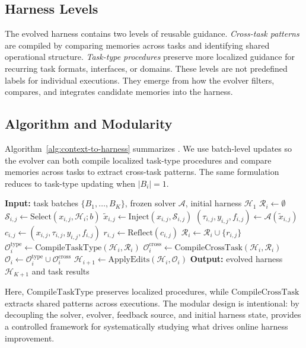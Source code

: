 \subsection{Harness Levels}
\label{sec:method-skill-levels}

The evolved harness contains two levels of reusable guidance. \emph{Cross-task patterns} are compiled by comparing memories across tasks and identifying shared operational structure. \emph{Task-type procedures} preserve more localized guidance for recurring task formats, interfaces, or domains. These levels are not predefined labels for individual executions. They emerge from how the evolver filters, compares, and integrates candidate memories into the harness.

\subsection{Algorithm and Modularity}
\label{sec:method-algorithm}

Algorithm~\ref{alg:context-to-harness} summarizes \algname{}. We use batch-level updates so the evolver can both compile localized task-type procedures and compare memories across tasks to extract cross-task patterns. The same formulation reduces to task-type updating when $|B_i|=1$.

\begin{algorithm}[t]
\caption{\algname{}: Context-to-Harness Skill Compilation}
\label{alg:context-to-harness}
\begin{algorithmic}[1]
\small
\STATE \textbf{Input:} task batches $\{B_1,\ldots,B_K\}$, frozen solver $\mathcal{A}$, initial harness $\mathcal{H}_1$
    \STATE $\mathcal{R}_i \gets \emptyset$
        \STATE $\mathcal{S}_{i,j}\gets \mathrm{Select}(x_{i,j},\mathcal{H}_i;b)$
        \STATE $\tilde{x}_{i,j}\gets \mathrm{Inject}(x_{i,j},\mathcal{S}_{i,j})$
        \STATE $(\tau_{i,j},y_{i,j},f_{i,j})\gets \mathcal{A}(\tilde{x}_{i,j})$
        \STATE $c_{i,j}\gets (x_{i,j},\tau_{i,j},y_{i,j},f_{i,j})$
        \STATE $r_{i,j}\gets \mathrm{Reflect}(c_{i,j})$
        \STATE $\mathcal{R}_i\gets \mathcal{R}_i\cup\{r_{i,j}\}$
    \ENDFOR
    \STATE $\mathcal{O}_i^{\mathrm{type}}\gets \mathrm{CompileTaskType}(\mathcal{H}_i,\mathcal{R}_i)$
    \STATE $\mathcal{O}_i^{\mathrm{cross}}\gets \mathrm{CompileCrossTask}(\mathcal{H}_i,\mathcal{R}_i)$
    \STATE $\mathcal{O}_i\gets \mathcal{O}_i^{\mathrm{type}}\cup \mathcal{O}_i^{\mathrm{cross}}$
    \STATE $\mathcal{H}_{i+1}\gets \mathrm{ApplyEdits}(\mathcal{H}_i,\mathcal{O}_i)$
\ENDFOR
\STATE \textbf{Output:} evolved harness $\mathcal{H}_{K+1}$ and task results
\end{algorithmic}
\end{algorithm}

Here, $\mathrm{CompileTaskType}$ preserves localized procedures, while $\mathrm{CompileCrossTask}$ extracts shared patterns across executions. The modular design is intentional: by decoupling the solver, evolver, feedback source, and initial harness state, \algname{} provides a controlled framework for systematically studying what drives online harness improvement.